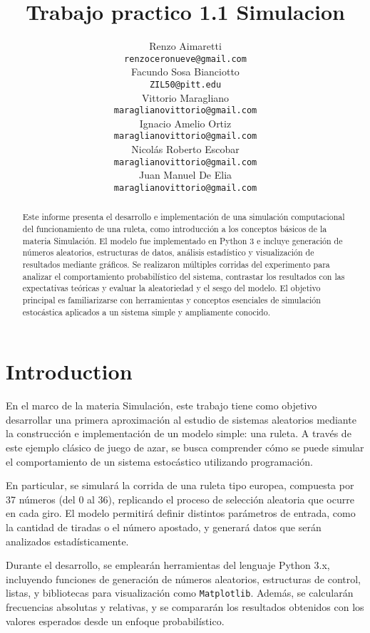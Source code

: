 \documentclass{article}
\title{Trabajo practico 1.1 Simulacion}
\author{
 Renzo Aimaretti \\
  \texttt{renzoceronueve@gmail.com} \\
   \And
 Facundo Sosa Bianciotto \\
  \texttt{ZIL50@pitt.edu} \\
  \And
 Vittorio Maragliano\\
  \texttt{maraglianovittorio@gmail.com} \\
    \And
 Ignacio Amelio Ortiz\\
  \texttt{maraglianovittorio@gmail.com} \\
    \And
 Nicolás Roberto Escobar\\
  \texttt{maraglianovittorio@gmail.com} \\
    \And
 Juan Manuel De Elia\\
  \texttt{maraglianovittorio@gmail.com} \\
}
\begin{document}
\maketitle
\begin{abstract}
Este informe presenta el desarrollo e implementación de una simulación computacional del funcionamiento de una ruleta, como introducción a los conceptos básicos de la materia Simulación. El modelo fue implementado en Python 3 e incluye generación de números aleatorios, estructuras de datos, análisis estadístico y visualización de resultados mediante gráficos. Se realizaron múltiples corridas del experimento para analizar el comportamiento probabilístico del sistema, contrastar los resultados con las expectativas teóricas y evaluar la aleatoriedad y el sesgo del modelo. El objetivo principal es familiarizarse con herramientas y conceptos esenciales de simulación estocástica aplicados a un sistema simple y ampliamente conocido.

\end{abstract}




\section{Introduction}
En el marco de la materia Simulación, este trabajo tiene como objetivo desarrollar una primera aproximación al estudio de sistemas aleatorios mediante la construcción e implementación de un modelo simple: una ruleta. A través de este ejemplo clásico de juego de azar, se busca comprender cómo se puede simular el comportamiento de un sistema estocástico utilizando programación.

En particular, se simulará la corrida de una ruleta tipo europea, compuesta por 37 números (del 0 al 36), replicando el proceso de selección aleatoria que ocurre en cada giro. El modelo permitirá definir distintos parámetros de entrada, como la cantidad de tiradas o el número apostado, y generará datos que serán analizados estadísticamente.

Durante el desarrollo, se emplearán herramientas del lenguaje Python 3.x, incluyendo funciones de generación de números aleatorios, estructuras de control, listas, y bibliotecas para visualización como \texttt{Matplotlib}. Además, se calcularán frecuencias absolutas y relativas, y se compararán los resultados obtenidos con los valores esperados desde un enfoque probabilístico.
\end{document}
